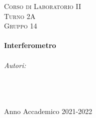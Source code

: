 \documentclass[a4paper]{article}
\begin{document}
\begin{titlepage}
\center
    
\textsc{\LARGE Corso di Laboratorio II}\\[1.5cm] %
\textsc{\large Turno 2A}\\[0.5cm] %
\textsc{\large Gruppo 14}\\[0.5cm]

\HRule \\[0.6cm]
{ \huge \bfseries Interferometro}\\[0.4cm] %
\HRule \\[1.5cm]
    

\Large \emph{Autori:} \\
\textsc{} \\
\textsc{} \\
\textsc{} \\ [4cm]

\vspace{8cm}

{\large Anno Accademico 2021-2022}\\[2cm] %


\vfill
\end{titlepage}




\tableofcontents
\clearpage

\listoffigures
{}
\clearpage

\setcounter{page}{1}
\end{document}
